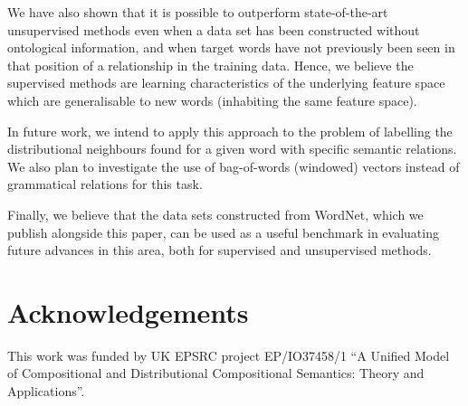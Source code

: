 \documentclass[11pt]{article}
\begin{document}
We have also shown that it is possible to outperform  state-of-the-art unsupervised methods even when a data set has been constructed without ontological information, and when target words have not previously been seen in that position of a relationship in the training data.  Hence, we believe the supervised methods are learning characteristics of the underlying feature space which are generalisable to new words (inhabiting the same feature space).  

In future work, we intend to apply this approach to the problem of
labelling the distributional neighbours found for a given word with
specific semantic relations. We also plan to investigate the use of
bag-of-words (windowed) vectors instead of grammatical relations for
this task.

Finally, we believe that the data sets constructed from WordNet, which we publish alongside this paper,  can be used as a useful benchmark in evaluating future advances in this area, both for supervised and unsupervised methods.

\section*{Acknowledgements}
This work was funded by UK EPSRC project EP/IO37458/1 ``A Unified Model of Compositional and Distributional Compositional Semantics: Theory and Applications''.




\end{document}
